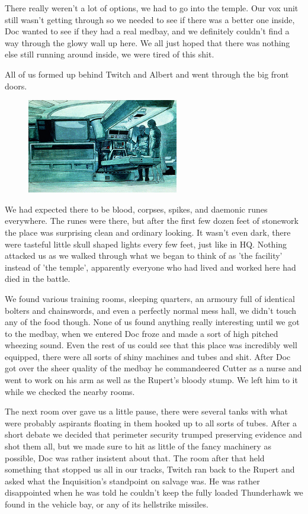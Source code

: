 There really weren't a lot of options, we had to go into the temple. 
Our vox unit still wasn't getting through so we needed to see if there was a better one inside, Doc wanted to see if they had a real medbay, and we definitely couldn't find a way through the glowy wall up here. 
We all just hoped that there was nothing else still running around inside, we were tired of this shit.

All of us formed up behind Twitch and Albert and went through the big front doors.

\begin{figure}
	\begin{center}
		\includegraphics[width=\figwidth]{pics/6/51.png}
	\end{center}
\end{figure}
We had expected there to be blood, corpses, spikes, and daemonic runes everywhere. 
The runes were there, but after the first few dozen feet of stonework the place was surprising clean and ordinary looking. 
It wasn't even dark, there were tasteful little skull shaped lights every few feet, just like in HQ. 
Nothing attacked us as we walked through what we began to think of as 'the facility' instead of 'the temple', apparently everyone who had lived and worked here had died in the battle.

We found various training rooms, sleeping quarters, an armoury full of identical bolters and chainswords, and even a perfectly normal mess hall, we didn't touch any of the food though. 
None of us found anything really interesting until we got to the medbay, when we entered Doc froze and made a sort of high pitched wheezing sound. 
Even the rest of us could see that this place was incredibly well equipped, there were all sorts of shiny machines and tubes and shit. 
After Doc got over the sheer quality of the medbay he commandeered Cutter as a nurse and went to work on his arm as well as the Rupert's bloody stump. 
We left him to it while we checked the nearby rooms.

The next room over gave us a little pause, there were several tanks with what were probably aspirants floating in them hooked up to all sorts of tubes. 
After a short debate we decided that perimeter security trumped preserving evidence and shot them all, but we made sure to hit as little of the fancy machinery as possible, Doc was rather insistent about that. 
The room after that held something that stopped us all in our tracks, Twitch ran back to the Rupert and asked what the Inquisition's standpoint on salvage was. 
He was rather disappointed when he was told he couldn't keep the fully loaded Thunderhawk we found in the vehicle bay, or any of its hellstrike missiles.


